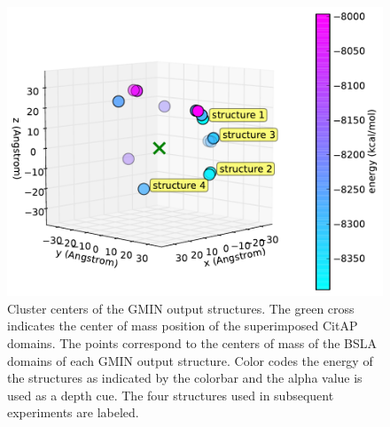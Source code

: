 \documentclass[english, a4paper, 12pt, titlepage, draft]{article}
\begin{document}
\begin{figure}
    \centering
    \includegraphics[width=1.0\textwidth]{figures/GMIN/CitA_phi_theta_3D.pdf}
    \caption{Cluster centers of the GMIN output structures. The green cross indicates the center of mass position of the superimposed CitAP domains. The points correspond to the centers of mass of the BSLA domains of each GMIN output structure. Color codes the energy of the structures as indicated by the colorbar and the alpha value is used as a depth cue. The four structures used in subsequent experiments are labeled.}
    \label{fig:GMIN_results}
\end{figure}       


 
\end{document}

